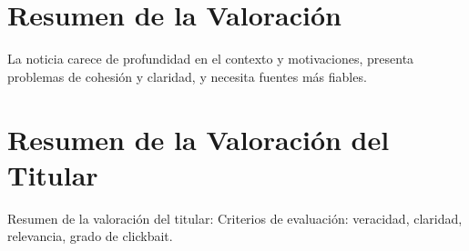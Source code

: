 \documentclass[10pt,a4paper]{article}
\begin{document}
\section*{Resumen de la Valoración}
    La noticia carece de profundidad en el contexto y motivaciones, presenta problemas de cohesi\'{o}n y claridad, y necesita fuentes m\'{a}s fiables.
\vspace{1em}

\section*{Resumen de la Valoración del Titular}
    Resumen de la valoraci\'{o}n del titular: Criterios de evaluaci\'{o}n: veracidad, claridad, relevancia, grado de clickbait.
\vspace{1em}

\end{document}
